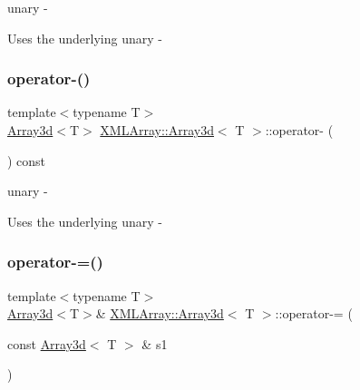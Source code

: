 unary -\/ 

Uses the underlying unary -\/ \mbox{\label{classXMLArray_1_1Array3d_ae6a356b75bd22316f0d4f94beea360d9}} 
\subsubsection{\texorpdfstring{operator-\/()}{operator-()}\hspace{0.1cm}{\footnotesize\ttfamily [2/2]}}
{\footnotesize\ttfamily template$<$typename T$>$ \\
\mbox{\hyperlink{classXMLArray_1_1Array3d}{Array3d}}$<$T$>$ \mbox{\hyperlink{classXMLArray_1_1Array3d}{X\+M\+L\+Array\+::\+Array3d}}$<$ T $>$\+::operator-\/ (\begin{DoxyParamCaption}{ }\end{DoxyParamCaption}) const\hspace{0.3cm}{\ttfamily [inline]}}



unary -\/ 

Uses the underlying unary -\/ \mbox{\label{classXMLArray_1_1Array3d_a9d4e2f24b2d52634a926ec4fb758828b}} 
\subsubsection{\texorpdfstring{operator-\/=()}{operator-=()}\hspace{0.1cm}{\footnotesize\ttfamily [1/2]}}
{\footnotesize\ttfamily template$<$typename T$>$ \\
\mbox{\hyperlink{classXMLArray_1_1Array3d}{Array3d}}$<$T$>$\& \mbox{\hyperlink{classXMLArray_1_1Array3d}{X\+M\+L\+Array\+::\+Array3d}}$<$ T $>$\+::operator-\/= (\begin{DoxyParamCaption}\item[{const \mbox{\hyperlink{classXMLArray_1_1Array3d}{Array3d}}$<$ T $>$ \&}]{s1 }\end{DoxyParamCaption})\hspace{0.3cm}{\ttfamily [inline]}}



